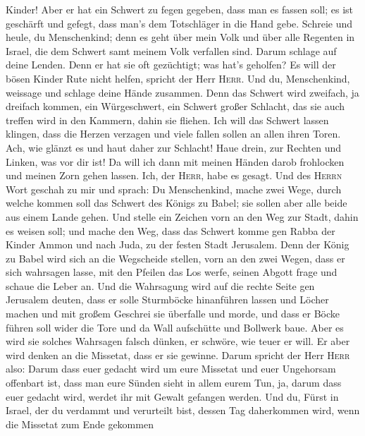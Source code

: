 Kinder!  Aber er hat ein Schwert zu fegen gegeben, dass
man es fassen soll; es ist geschärft und gefegt, dass man's dem
Totschläger in die Hand gebe.  Schreie und heule, du
Menschenkind; denn es geht über mein Volk und über alle Regenten in
Israel, die dem Schwert samt meinem Volk verfallen sind. Darum schlage
auf deine Lenden.  Denn er hat sie oft gezüchtigt; was
hat's geholfen? Es will der bösen Kinder Rute nicht helfen, spricht der
Herr \textsc{Herr}.  Und du, Menschenkind, weissage und
schlage deine Hände zusammen. Denn das Schwert wird zweifach, ja
dreifach kommen, ein Würgeschwert, ein Schwert großer Schlacht, das sie
auch treffen wird in den Kammern, dahin sie fliehen.  Ich
will das Schwert lassen klingen, dass die Herzen verzagen und viele
fallen sollen an allen ihren Toren. Ach, wie glänzt es und haut daher
zur Schlacht!  Haue drein, zur Rechten und Linken, was
vor dir ist!  Da will ich dann mit meinen Händen darob
frohlocken und meinen Zorn gehen lassen. Ich, der \textsc{Herr}, habe es
gesagt.  Und des \textsc{Herrn} Wort geschah zu mir und
sprach:  Du Menschenkind, mache zwei Wege, durch welche
kommen soll das Schwert des Königs zu Babel; sie sollen aber alle beide
aus einem Lande gehen.  Und stelle ein Zeichen vorn an
den Weg zur Stadt, dahin es weisen soll; und mache den Weg, dass das
Schwert komme gen Rabba der Kinder Ammon und nach Juda, zu der festen
Stadt Jerusalem.  Denn der König zu Babel wird sich an
die Wegscheide stellen, vorn an den zwei Wegen, dass er sich wahrsagen
lasse, mit den Pfeilen das Los werfe, seinen Abgott frage und schaue die
Leber an.  Und die Wahrsagung wird auf die rechte Seite
gen Jerusalem deuten, dass er solle Sturmböcke hinanführen lassen und
Löcher machen und mit großem Geschrei sie überfalle und morde, und dass
er Böcke führen soll wider die Tore und da Wall aufschütte und Bollwerk
baue.  Aber es wird sie solches Wahrsagen falsch dünken,
er schwöre, wie teuer er will. Er aber wird denken an die Missetat, dass
er sie gewinne.  Darum spricht der Herr \textsc{Herr}
also: Darum dass euer gedacht wird um eure Missetat und euer Ungehorsam
offenbart ist, dass man eure Sünden sieht in allem eurem Tun, ja, darum
dass euer gedacht wird, werdet ihr mit Gewalt gefangen werden.
 Und du, Fürst in Israel, der du verdammt und verurteilt
bist, dessen Tag daherkommen wird, wenn die Missetat zum Ende gekommen
